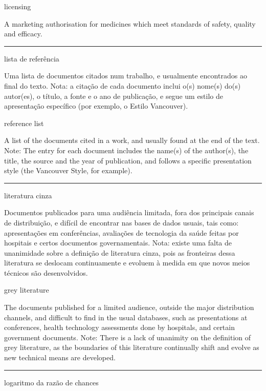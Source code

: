 \documentclass[
  openany]{book}
\begin{document}
licensing

A marketing authorisation for medicines which meet standards of safety, quality and efficacy.

\begin{center}\rule{0.5\linewidth}{0.5pt}\end{center}

lista de referência

Uma lista de documentos citados num trabalho, e usualmente encontrados ao final do texto. Nota: a citação de cada documento inclui o(s) nome(s) do(s) autor(es), o título, a fonte e o ano de publicação, e segue um estilo de apresentação específico (por exemplo, o Estilo Vancouver).

reference list

A list of the documents cited in a work, and usually found at the end of the text. Note: The entry for each document includes the name(s) of the author(s), the title, the source and the year of publication, and follows a specific presentation style (the Vancouver Style, for example).

\begin{center}\rule{0.5\linewidth}{0.5pt}\end{center}

literatura cinza

Documentos publicados para uma audiência limitada, fora dos principais canais de distribuição, e difícil de encontrar nas bases de dados usuais, tais como: apresentações em conferências, avaliações de tecnologia da saúde feitas por hospitais e certos documentos governamentais. Nota: existe uma falta de unanimidade sobre a definição de literatura cinza, pois as fronteiras dessa literatura se deslocam continuamente e evoluem à medida em que novos meios técnicos são desenvolvidos.

grey literature

The documents published for a limited audience, outside the major distribution channels, and difficult to find in the usual databases, such as presentations at conferences, health technology assessments done by hospitals, and certain government documents. Note: There is a lack of unanimity on the definition of grey literature, as the boundaries of this literature continually shift and evolve as new technical means are developed.

\begin{center}\rule{0.5\linewidth}{0.5pt}\end{center}

logaritmo da razão de chances
\end{document}
